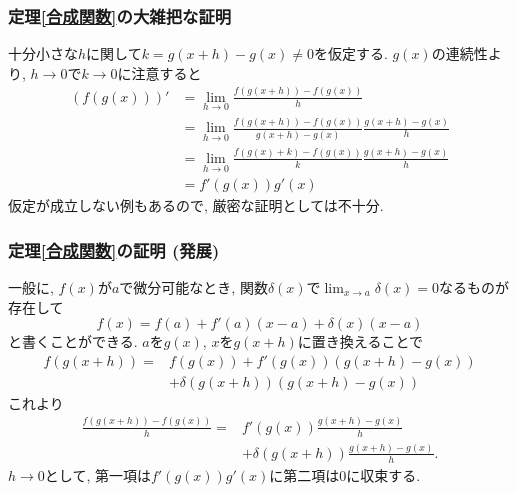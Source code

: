 

\begin{frame}
\frametitle{定理\ref{合成関数}の大雑把な証明}


十分小さな$h$に関して$k=g(x+h)- g(x)\ne 0$を仮定する. 
$g(x)$の連続性より, $h \to 0$で$k\to 0$に注意すると
\begin{align*} 
(f(g(x)))' &= \lim_{h\to 0}\frac{f(g(x+h))-f(g(x))}{h} \\
& =  \lim_{h\to 0}\frac{f(g(x+h))-f(g(x))}{g(x+h)-g(x)} \frac{g(x+h)-g(x)}{h} \\
& =  \lim_{h\to 0}\frac{f(g(x)+k)-f(g(x))}{k} \frac{g(x+h)-g(x)}{h} \\
& =f'(g(x))g'(x)
\end{align*}
仮定が成立しない例もあるので, 厳密な証明としては不十分. 

\end{frame}




\begin{frame}
\frametitle{定理\ref{合成関数}の証明 (発展)}


一般に, $f(x)$が$a$で微分可能なとき, 関数$\delta(x)$で$\displaystyle \lim_{x\to a}\delta(x)=0$なるものが存在して
$$
f(x)=f(a)+f'(a)(x-a)+\delta(x)(x-a)
$$
と書くことができる. 
$a$を$g(x)$, $x$を$g(x+h)$に置き換えることで
\begin{align*} 
f(g(x+h))=& f(g(x))+f'(g(x))(g(x+h)-g(x)) \\
&+\delta(g(x+h))(g(x+h)-g(x)) 
\end{align*}
これより
\begin{align*} 
\frac{f(g(x+h))-f(g(x))}{h}= & f'(g(x))\frac{g(x+h)-g(x)}{h} \\
&+\delta(g(x+h))\frac{g(x+h)-g(x)}{h}. 
\end{align*}
$h\to 0$として, 第一項は$f'(g(x))g'(x)$に第二項は$0$に収束する. 
\end{frame}






